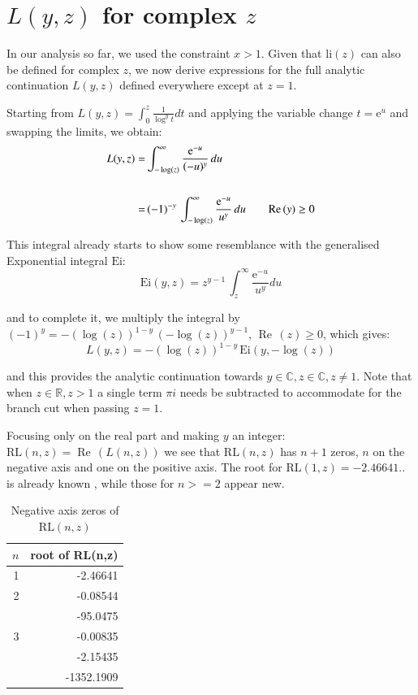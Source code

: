 \documentclass[a4paper,11pt,twoside]{amsart}
\newcommand\e{\mathrm{e}}
\newcommand\Ei{\mathrm{Ei}}
\newcommand\li{\mathrm{li}}
\newcommand\RL{\mathrm{RL}}
\renewcommand\Re{{\operatorname{Re\,}}}
\begin{document}
\section{$L(y,z)$ for complex $z$}

In our analysis so far, we used the constraint $x > 1$. Given that $\li(z)$ can also be defined for complex $z$, we now derive expressions for the full analytic continuation $L(y,z)$ defined everywhere except at $z=1$.

Starting from $L(y,z) = \int_0^z \frac{1}{\log^y t} dt$ and applying the variable change $t = \e^u$ and swapping the limits, we obtain:
\begin{align}
L(y,z) =& \int_{-\log(z)}^{\infty} \frac{\e^{-u}}{(-u)^y} \,du  \\ 
\notag \\
 =&\, (-1)^{-y}\,\int_{-\log(z)}^{\infty} \frac{\e^{-u}}{u^y} \,du \qquad \Re(y) \geq 0  
\end{align}

This integral already starts to show some resemblance with the generalised Exponential integral $\Ei$: 
\begin{equation}\label{rootscomp}
 \Ei(y,z) = z^{y-1}\,\int_z^{\infty} \frac{\e^{-u}}{u^y} du
\end{equation}

and to complete it, we multiply the integral by $(-1)^y = -\left(\log(z)\right)^{1-y}\,(-\log(z))^{y-1},\, \Re(z) \ge 0$, which gives: 
\begin{equation}\label{rootscomp1}
  L(y,z) = -\left(\log(z)\right)^{1-y}\,\Ei\left(y, -\log(z)\right)
\end{equation}

and this provides the analytic continuation towards $y \in \mathbb{C}, z \in \mathbb{C}, z \ne 1$. Note that when $z \in \mathbb{R}, z > 1$ a single term $\pi i$ needs be subtracted to accommodate for the branch cut when passing $z = 1$.

Focusing only on the real part and making $y$ an integer: $\RL(n,z) = \Re(L(n,z))$ we see that $\RL(n,z)$ has $n+1$ zeros, $n$ on the negative axis and one on the positive axis. The root for $\RL(1,z)=-2.46641..$ is already known \cite{oeis1}, while those for $n>=2$ appear new.

\begin{table}[H]
  \begin{center}
    \begin{tabular}{r|r} %
      $n$ & root of RL(n,z)\\
      \hline
      1 & -2.46641\\
      \hline
      2 & -0.08544\\&-95.0475\\
      \hline
      3 & -0.00835\\&-2.15435\\&-1352.1909\\
    \end{tabular}
  \end{center}
  \caption{Negative axis zeros of $\RL(n,z)$}
\end{table}
\vspace{-2em}
\end{document}
